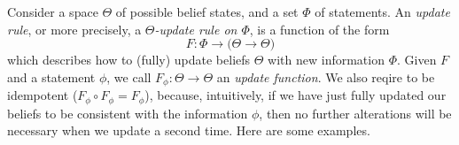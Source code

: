 \documentclass{article}
\begin{document}
Consider a space $\Theta$
of possible belief states,
and a set $\Phi$ of statements.
An \emph{update rule}, or more precisely, a \emph{$\Theta$-update rule on $\Phi$},
is a function of the form
\[
    F :  \Phi \to \Big( \Theta \to \Theta \Big)
\]
which describes how to (fully) update beliefs $\Theta$ with new information $\Phi$.
Given $F$ and a statement $\phi$, we call $F_\phi : \Theta \to \Theta$ an \emph{update function}.
We also reqire to be idempotent ($F_\phi \circ F_\phi = F_\phi$),
because, intuitively, if we have just {fully} updated our beliefs to be consistent with the information $\phi$, then no further alterations will be necessary when we update a second time. 
Here are some examples.
\end{document}
